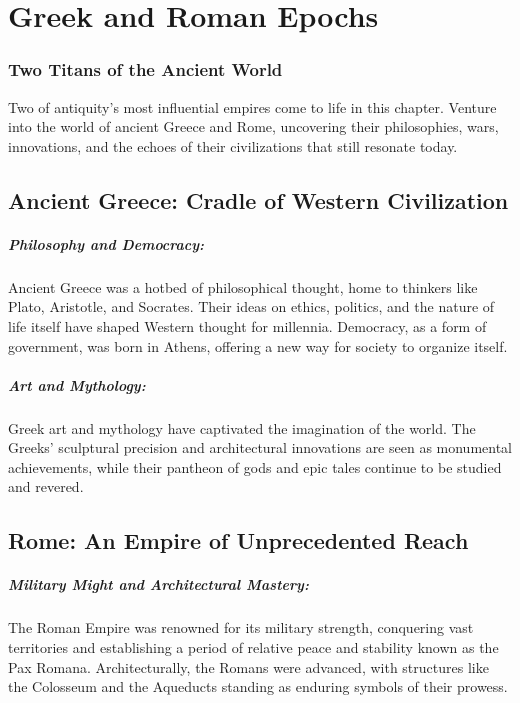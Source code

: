 \documentclass{book}
\begin{document}
\chapter{Greek and Roman Epochs}
\subsection*{Two Titans of the Ancient World}
Two of antiquity's most influential empires come to life in this chapter. Venture into the world of ancient Greece and Rome, uncovering their philosophies, wars, innovations, and the echoes of their civilizations that still resonate today.

\section*{Ancient Greece: Cradle of Western Civilization}

\paragraph{Philosophy and Democracy:}
Ancient Greece was a hotbed of philosophical thought, home to thinkers like Plato, Aristotle, and Socrates. Their ideas on ethics, politics, and the nature of life itself have shaped Western thought for millennia. Democracy, as a form of government, was born in Athens, offering a new way for society to organize itself.

\paragraph{Art and Mythology:}
Greek art and mythology have captivated the imagination of the world. The Greeks’ sculptural precision and architectural innovations are seen as monumental achievements, while their pantheon of gods and epic tales continue to be studied and revered.

\section*{Rome: An Empire of Unprecedented Reach}

\paragraph{Military Might and Architectural Mastery:}
The Roman Empire was renowned for its military strength, conquering vast territories and establishing a period of relative peace and stability known as the Pax Romana. Architecturally, the Romans were advanced, with structures like the Colosseum and the Aqueducts standing as enduring symbols of their prowess.
\end{document}

